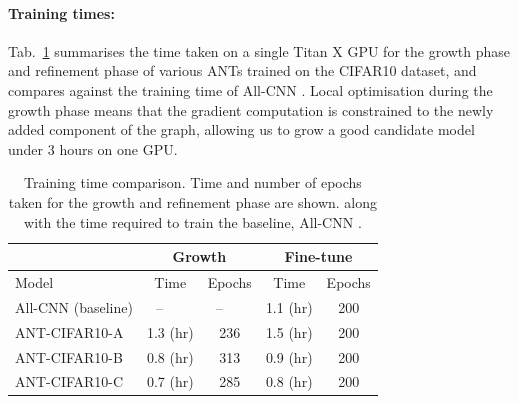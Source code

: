 \paragraph{Training times:}\label{sec:supp_traintime}
Tab.~\ref{table:traintime} summarises the time taken on a single Titan X GPU for the growth phase and refinement phase of various ANTs trained on the CIFAR10 dataset, and compares against the training time of All-CNN \cite{springenberg2014striving}. Local optimisation during the growth phase means that the gradient computation is constrained to the newly added component of the graph, allowing us to grow a good candidate model under $3$ hours on one GPU. 
\begin{table}[ht]
	\footnotesize
	\caption{\footnotesize Training time comparison. Time and number of epochs taken for the growth and refinement phase are shown. along with the time required to train the baseline, All-CNN \cite{springenberg2014striving}.}
	\label{table:traintime}
	\vspace{-7mm}
	\begin{center}
		\begin{tabular}{l|c|c|c|c}
			\hline
			\multicolumn{1}{c}{} &  \multicolumn{2}{c}{\textbf{Growth}} & \multicolumn{2}{c}{\textbf{Fine-tune}}  \\
			\hline
			Model & Time & Epochs  & Time  & Epochs\\
			\hline
			All-CNN (baseline)&--~~~ & --~~~ & 1.1 (hr) &200 \\
			ANT-CIFAR10-A&1.3 (hr) & 236  & 1.5 (hr) &200 \\
			ANT-CIFAR10-B & 0.8 (hr) & 313 & 0.9 (hr) & 200\\
			ANT-CIFAR10-C&  0.7 (hr) &  285& 0.8 (hr) & 200 \\
			\hline
		\end{tabular}
		
	\end{center}
\end{table}
 

